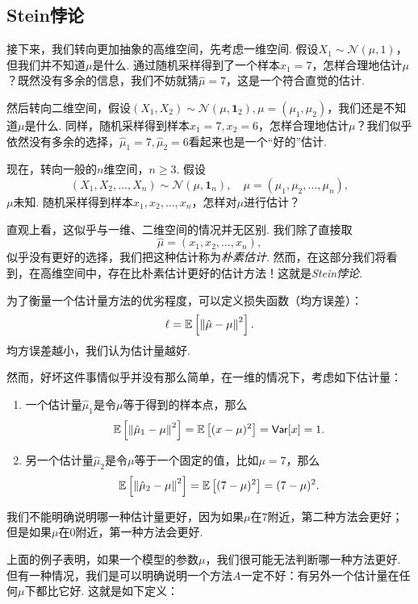 \subsection{Stein悖论}
接下来，我们转向更加抽象的高维空间，先考虑一维空间. 假设$X_1 \sim \mathcal{N}(\mu,1)$，但我们并不知道$\mu$是什么. 通过随机采样得到了一个样本$x_1 = 7$，怎样合理地估计$\mu$？既然没有多余的信息，我们不妨就猜$\hat{\mu} = 7$，这是一个符合直觉的估计. 

然后转向二维空间，假设$(X_1, X_2) \sim \mathcal{N}(\mu,\mathbf{1}_2), \mu=(\mu_1,\mu_2)$，我们还是不知道$\mu$是什么. 同样，随机采样得到样本$x_1 = 7, x_2=6$，怎样合理地估计$\mu$？我们似乎依然没有多余的选择，$\hat{\mu}_1 = 7, \hat{\mu}_2=6$看起来也是一个“好的”估计. 

现在，转向一般的$n$维空间，$n\geq 3$. 假设
\[(X_1,X_2,\dots, X_n) \sim \mathcal{N}(\mu, \mathbf{1}_n),\quad \mu=(\mu_1,\mu_2,\dots,\mu_n),\]
$\mu$未知. 随机采样得到样本$x_1,x_2,\dots,x_n$，怎样对$\mu$进行估计？

直观上看，这似乎与一维、二维空间的情况并无区别. 我们除了直接取
\begin{equation}
    \hat{\mu}=(x_1,x_2,\dots,x_n), \label{eq:naive-estimation}
\end{equation}
似乎没有更好的选择，我们把这种估计称为\emph{朴素估计}. 然而，在这部分我们将看到，在高维空间中，存在比朴素估计更好的估计方法！这就是\emph{Stein悖论}. 

为了衡量一个估计量方法的优劣程度，可以定义损失函数（均方误差）：
\[\ell = \mathbb{E}\left[\left\|\hat{\mu}-\mu\right\|^2\right].\]
均方误差越小，我们认为估计量越好. 

然而，好坏这件事情似乎并没有那么简单，在一维的情况下，考虑如下估计量：
\begin{enumerate}
    \item 一个估计量$\hat\mu_1$是令$\mu$等于得到的样本点，那么
    \[\mathbb{E}\left[\left\|\hat{\mu}_1-\mu\right\|^2\right] = \mathbb{E}\left[(x-\mu)^2\right]=\mathsf{Var}[x]=1.\]
    \item 另一个估计量$\hat\mu_2$是令$\mu$等于一个固定的值，比如$\mu=7$，那么
    \[\mathbb{E}\left[\left\|\hat{\mu}_2-\mu\right\|^2\right] = \mathbb{E}\left[(7-\mu)^2\right]=(7-\mu)^2.\]
\end{enumerate}

我们不能明确说明哪一种估计量更好，因为如果$\mu$在$7$附近，第二种方法会更好；但是如果$\mu$在$0$附近，第一种方法会更好. 

上面的例子表明，如果一个模型的参数$\mu$，我们很可能无法判断哪一种方法更好. 但有一种情况，我们是可以明确说明一个方法$A$一定不好：有另外一个估计量在任何$\mu$下都比它好. 这就是如下定义：

